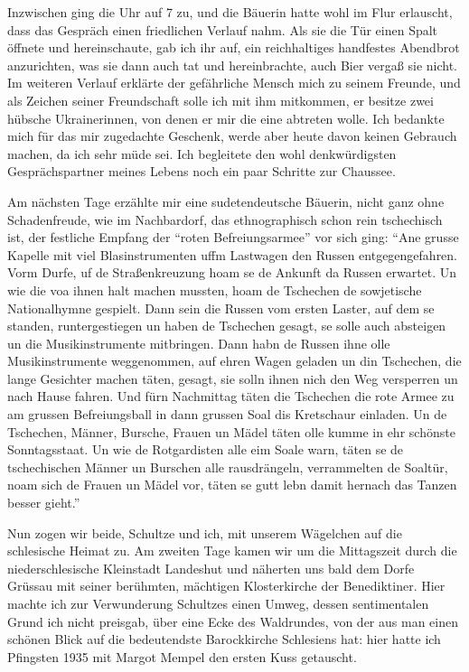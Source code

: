 Inzwischen ging die Uhr auf 7 zu, und die Bäuerin hatte wohl im Flur erlauscht, dass das Gespräch einen friedlichen Verlauf nahm. Als sie die Tür einen Spalt öffnete und hereinschaute, gab ich ihr auf, ein reichhaltiges handfestes Abendbrot anzurichten, was sie dann auch tat und hereinbrachte, auch Bier vergaß sie nicht. Im weiteren Verlauf erklärte der gefährliche Mensch mich zu seinem Freunde, und als Zeichen seiner Freundschaft solle ich mit ihm mitkommen, er besitze zwei hübsche Ukrainerinnen, von denen er mir die eine abtreten wolle. Ich bedankte mich für das mir  zugedachte Geschenk, werde aber heute davon keinen Gebrauch machen, da ich sehr müde sei. Ich begleitete den wohl denkwürdigsten Gesprächspartner meines Lebens noch ein paar Schritte zur Chaussee.

Am nächsten Tage erzählte mir eine sudetendeutsche Bäuerin, nicht ganz ohne Schadenfreude, wie im Nachbardorf, das ethnographisch schon rein tschechisch ist, der festliche Empfang der \enquote{roten Befreiungsarmee} vor sich ging: \enquote{Ane grusse Kapelle mit viel Blasinstrumenten uffm Lastwagen den Russen entgegengefahren. Vorm Durfe, uf de Straßenkreuzung hoam se de Ankunft da Russen erwartet. Un wie die voa ihnen halt machen mussten, hoam de Tschechen de sowjetische Nationalhymne gespielt. Dann sein die Russen vom ersten Laster, auf dem se standen, runtergestiegen un haben de Tschechen gesagt, se solle auch absteigen un die Musikinstrumente mitbringen. Dann habn de Russen ihne olle Musikinstrumente weggenommen, auf ehren Wagen geladen un din Tschechen, die lange Gesichter machen täten, gesagt, sie solln ihnen nich den Weg versperren un nach Hause fahren. Und fürn Nachmittag täten die Tschechen die rote Armee zu am grussen Befreiungsball  in dann grussen Soal dis Kretschaur einladen. Un de Tschechen, Männer, Bursche, Frauen un Mädel täten olle kumme in ehr schönste Sonntagsstaat. Un wie de Rotgardisten alle eim Soale warn, täten se de tschechischen Männer un Burschen alle rausdrängeln, verrammelten de Soaltür, noam sich de Frauen un Mädel vor, täten se gutt lebn damit hernach das Tanzen besser gieht.}

Nun zogen wir beide, Schultze und ich, mit unserem Wägelchen auf die schlesische Heimat zu. Am zweiten Tage kamen wir um die Mittagszeit durch die niederschlesische Kleinstadt Landeshut und näherten uns bald dem Dorfe Grüssau mit seiner berühmten, mächtigen Klosterkirche der Benediktiner. Hier machte ich zur Verwunderung Schultzes einen Umweg, dessen sentimentalen Grund ich nicht preisgab, über eine Ecke des Waldrundes, von der aus man einen schönen Blick auf die bedeutendste Barockkirche Schlesiens hat: hier hatte ich Pfingsten 1935 mit Margot Mempel den ersten Kuss getauscht.

